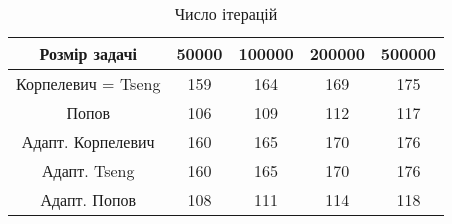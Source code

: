 \begin{table}[H]
	\centering
	\begin{tabular}{|c||c|c|c|c|}\hline
		Розмір задачі & 50000 & 100000 & 200000 & 500000 \\ \hline \hline
		Корпелевич = Tseng & 159 & 164 & 169 & 175 \\ \hline
		Попов & 106 & 109 & 112 & 117 \\ \hline \hline
		Адапт. Корпелевич & 160 & 165 & 170 & 176 \\ \hline
		Адапт. Tseng & 160 & 165 & 170 & 176 \\ \hline
		Адапт. Попов & 108 & 111 & 114 & 118 \\ \hline
	\end{tabular}
	\caption{Число ітерацій}
\end{table}
